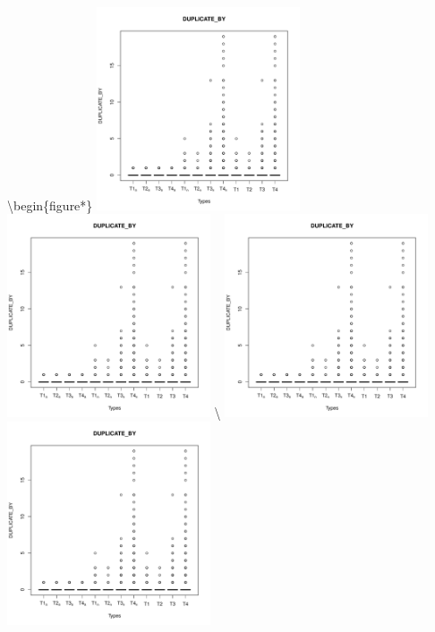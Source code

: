 \textbackslash{}begin\{figure*\} \centering
\includegraphics[page=1, width=0.45\textwidth]{extract/Rplots}
\includegraphics[page=2, width=0.45\textwidth]{extract/Rplots}
\textbackslash{}
\includegraphics[page=3, width=0.45\textwidth]{extract/Rplots}
\includegraphics[page=4, width=0.45\textwidth]{extract/Rplots}
